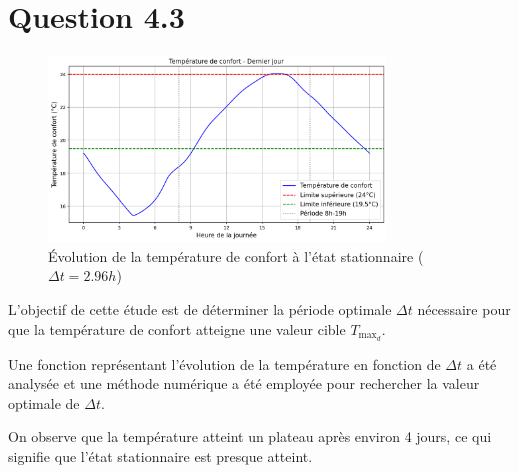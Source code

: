 \documentclass[12pt]{article}
\begin{document}
\section{Question 4.3}
\begin{figure}[H]
    \centering
    \includegraphics[width=0.8\textwidth]{Rapport/figures/T_confort_dernier_jour.png} %
    \caption{Évolution de la température de confort à l'état stationnaire ($\Delta t = 2.96h$)}
    \label{fig:temperature_confort}
\end{figure}
\vspace{0.5cm}

 L’objectif de cette étude est de déterminer la période optimale $\Delta t$ nécessaire pour que la température de confort atteigne une valeur cible $T_{\max_d}$.  

Une fonction représentant l’évolution de la température en fonction de $\Delta t$ a été analysée et une méthode numérique a été employée pour rechercher la valeur optimale de $\Delta t$.

On observe que la température atteint un plateau après environ 4 jours, ce qui signifie que l’état stationnaire est presque atteint.
\end{document}
